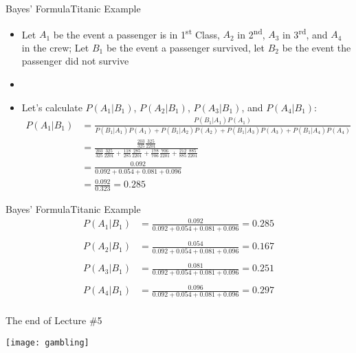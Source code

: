 \documentclass[xcolor=dvipsnames]{beamer}
\begin{document}
\begin{frame}{Bayes' Formula}{Titanic Example}
	\begin{itemize}
		\item Let $A_1$ be the event a passenger is in 1\textsuperscript{st} Class, $A_2$ in 2\textsuperscript{nd}, $A_3$ in 3\textsuperscript{rd}, and $A_4$ in the crew; Let $B_1$ be the event a passenger survived, let $B_2$ be the event the passenger did not survive \pause
		\item[]
		\item Let's calculate $P(A_1|B_1)$, $P(A_2|B_1)$, $P(A_3|B_1)$, and $P(A_4|B_1)$:\pause
		{\scriptsize
		\begin{align*}
			P(A_1|B_1) &= \frac{P(B_1|A_1)P(A_1)}{P(B_1|A_1)P(A_1) + P(B_1|A_2)P(A_2) + P(B_1|A_3)P(A_3) + P(B_1|A_4)P(A_4)} \\
			&= \frac{\frac{203}{325}\frac{325}{2201}}{\frac{203}{325}\frac{325}{2201} + \frac{118}{285}\frac{285}{2201} + \frac{178}{706}\frac{706}{2201} + \frac{212}{885}\frac{885}{2201}} \\
			&= \frac{0.092}{0.092 + 0.054 + 0.081 + 0.096} \\
			&= \frac{0.092}{0.323} = 0.285
		\end{align*}}
	\end{itemize}
\end{frame}

\begin{frame}{Bayes' Formula}{Titanic Example}
	\begin{align*}
		P(A_1|B_1) &= \frac{0.092}{0.092 + 0.054 + 0.081 + 0.096} = 0.285 \\ \\
		P(A_2|B_1) &= \frac{0.054}{0.092 + 0.054 + 0.081 + 0.096} = 0.167\\ \\
		P(A_3|B_1) &= \frac{0.081}{0.092 + 0.054 + 0.081 + 0.096} = 0.251\\ \\
		P(A_4|B_1) &= \frac{0.096}{0.092 + 0.054 + 0.081 + 0.096} = 0.297\\
	\end{align*}
\end{frame}

\begin{frame}{The end of Lecture \#5}
	\begin{center}
		\texttt{[image: gambling]}
	\end{center}
\end{frame}
\end{document}
